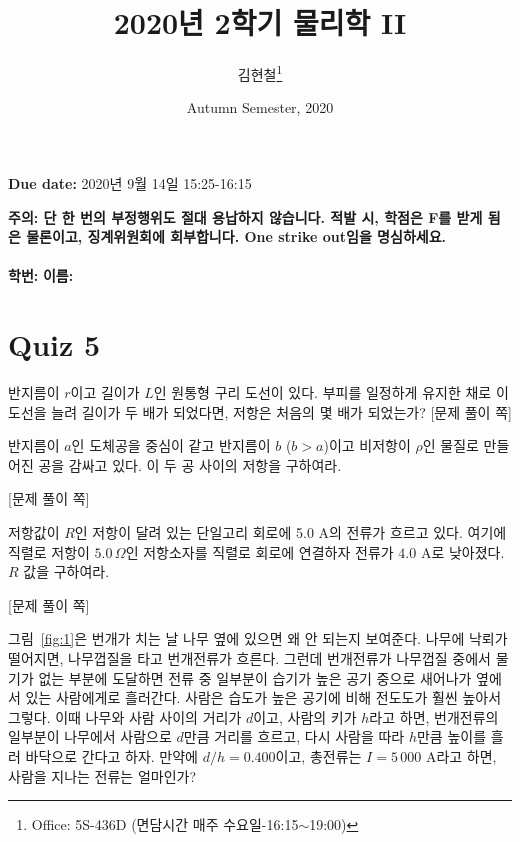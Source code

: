 \documentclass[tightenlines,floatfix,nofootinbib,superscriptaddress,fleqn]{revtex4}
\begin{document}
\title{\Large 2020년 2학기 물리학 II}
\author{김현철\footnote{Office: 5S-436D (면담시간 매주
    수요일-16:15$\sim$19:00)}} 
\date{Autumn Semester, 2020}

\maketitle

{\color{red} {\bf Due date:} 2020년 9월 14일  15:25-16:15 }
\vspace{1.cm}

\noindent \textbf{ 주의: \color{blue} 단 한 번의 부정행위도 절대
  용납하지 않습니다. 적발 시, 학점은 F를 받게 됨은 물론이고,
  징계위원회에 회부합니다. One strike out임을 명심하세요.} 
\\
\\

{\bf 학번:} \hspace{4cm}
{\bf 이름:} 

\section*{\large Quiz 5}
 반지름이 $r$이고 길이가 $L$인 원통형
구리 도선이 있다. 부피를 일정하게 유지한 채로 이 도선을 늘려 길이가 두
배가 되었다면, 저항은 처음의 몇 배가 되었는가? 
\newpage
{\color{gray} [문제 풀이 쪽]}
\newpage

 반지름이 $a$인 도체공을 중심이 같고
반지름이 $b$ ($b>a$)이고 비저항이 $\rho$인 물질로 만들어진 공을 감싸고
있다. 이 두 공 사이의 저항을 구하여라.  

\newpage
{\color{gray} [문제 풀이 쪽]} 
\newpage

저항값이 $R$인 저항이 달려 있는 단일고리
회로에 5.0 A의 전류가 흐르고 있다. 여기에 직렬로 저항이 $5.0\,\Omega$인
저항소자를 직렬로 회로에 연결하자 전류가 $4.0$ A로 낮아졌다. $R$ 값을
구하여라.   

\newpage
{\color{gray} [문제 풀이 쪽]}
\newpage

그림~\ref{fig:1}은 번개가 치는 날 나무 옆에 있으면 왜 안 되는지
보여준다. 나무에 낙뢰가 떨어지면, 나무껍질을 타고 번개전류가 흐른다.
그런데 번개전류가 나무껍질 중에서 물기가 없는 부분에 도달하면 전류 중
일부분이 습기가 높은 공기 중으로 새어나가 옆에 서 있는 사람에게로
흘러간다. 사람은 습도가 높은 공기에 비해 전도도가 훨씬 높아서
그렇다. 이때 나무와 사람 사이의 거리가 $d$이고, 사람의 키가 $h$라고
하면, 번개전류의 일부분이 나무에서 사람으로 $d$만큼 거리를 흐르고,
다시 사람을 따라 $h$만큼 높이를 흘러 바닥으로 간다고 하자. 만약에
$d/h=0.400$이고, 총전류는 $I=5\,000$ A라고 하면, 사람을 지나는 전류는
얼마인가? 
\end{document}
